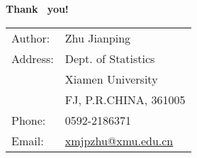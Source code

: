

\begin{frame}
 \begin{center}
{\huge \textbf{\textcolor[rgb]{0.50,0.20,.90}{Thank  ~you!}}}               \\
\vspace{5mm}\xiaowu
\begin{tabular}{ll}
{\sc Author}:  & Zhu Jianping                                           \\
{\sc Address}: & Dept. of Statistics                            \\
               & Xiamen University                                          \\
               & FJ, P.R.CHINA, 361005                                     \\
  {\sc Phone}: & 0592-2186371                          \\
  {\sc Email}: & \href{mailto:xmjpzhu@xmu.edu.cn}{ \color{blue}xmjpzhu@xmu.edu.cn }\\
\end{tabular}
\end{center}
\end{frame}





